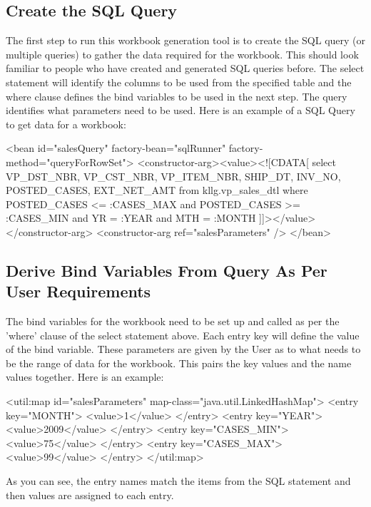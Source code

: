 \documentclass[letterpaper,10pt]{article}
\begin{document}
\subsection{Create the SQL Query}
The first step to run this workbook generation tool is to create the SQL query (or multiple queries) to gather the data required for the workbook.  This should look familiar to people who have created and generated SQL queries before.  The select statement will identify the columns to be used from the specified table and the where clause defines the bind variables to be used in the next step.  The query identifies what parameters need to be used.
\newline
Here is an example of a SQL Query to get data for a workbook:
\begin{verbatimtab}
	<bean id="salesQuery" factory-bean="sqlRunner" factory-method="queryForRowSet">
		<constructor-arg><value><![CDATA[ 
	select 
		VP_DST_NBR,
		VP_CST_NBR,
		VP_ITEM_NBR,
		SHIP_DT,
		INV_NO,
		POSTED_CASES,
		EXT_NET_AMT
	from 
		kllg.vp_sales_dtl
	where
		POSTED_CASES <= :CASES_MAX and 
		POSTED_CASES >= :CASES_MIN and
		YR = :YEAR and MTH = :MONTH
		]]></value></constructor-arg>
		<constructor-arg ref="salesParameters" />
	</bean>
\end{verbatimtab}

\subsection{Derive Bind Variables From Query As Per User Requirements}
The bind variables for the workbook need to be set up and called as per the 'where' clause of the select statement above.  Each entry key will define the value of the bind variable.  These parameters are given by the User as to what needs to be the range of data for the workbook.  This pairs the key values and the name values together.  Here is an example:
\begin{verbatimtab}
 <util:map id="salesParameters" map-class="java.util.LinkedHashMap">
		<entry key="MONTH">
			<value>1</value>
		</entry>
		<entry key="YEAR">
			<value>2009</value>
		</entry>
		<entry key="CASES_MIN">
			<value>75</value>
		</entry>
		<entry key="CASES_MAX">
			<value>99</value>
		</entry>
 </util:map>
\end{verbatimtab}
As you can see, the entry names match the items from the SQL statement and then values are assigned to each entry.
\end{document}
